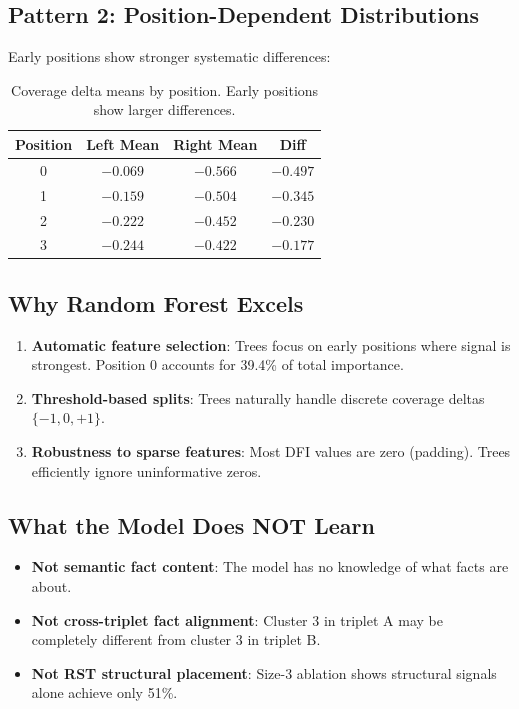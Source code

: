 \documentclass[11pt]{article}
\begin{document}
\subsection{Pattern 2: Position-Dependent Distributions}

Early positions show stronger systematic differences:

\begin{table}[h]
\centering
\small
\begin{tabular}{cccc}
\toprule
\textbf{Position} & \textbf{Left Mean} & \textbf{Right Mean} & \textbf{Diff} \\
\midrule
0 & $-0.069$ & $-0.566$ & $-0.497$ \\
1 & $-0.159$ & $-0.504$ & $-0.345$ \\
2 & $-0.222$ & $-0.452$ & $-0.230$ \\
3 & $-0.244$ & $-0.422$ & $-0.177$ \\
\bottomrule
\end{tabular}
\caption{Coverage delta means by position. Early positions show larger differences.}
\label{tab:positions}
\end{table}

\subsection{Why Random Forest Excels}

\begin{enumerate}
    \item \textbf{Automatic feature selection}: Trees focus on early positions where signal is strongest. Position 0 accounts for 39.4\% of total importance.
    \item \textbf{Threshold-based splits}: Trees naturally handle discrete coverage deltas $\{-1, 0, +1\}$.
    \item \textbf{Robustness to sparse features}: Most DFI values are zero (padding). Trees efficiently ignore uninformative zeros.
\end{enumerate}

\subsection{What the Model Does NOT Learn}

\begin{itemize}
    \item \textbf{Not semantic fact content}: The model has no knowledge of what facts are about.
    \item \textbf{Not cross-triplet fact alignment}: Cluster 3 in triplet A may be completely different from cluster 3 in triplet B.
    \item \textbf{Not RST structural placement}: Size-3 ablation shows structural signals alone achieve only 51\%.
\end{itemize}
\end{document}
